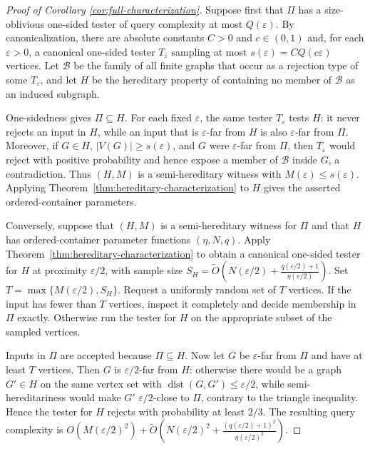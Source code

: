 \documentclass[11pt,reqno,letterpaper]{amsart}
\newcommand{\cB}{{\mathcal B}}
\newcommand{\dist}{\operatorname{dist}}
\theoremstyle{plain}
\theoremstyle{remark}
\begin{document}
\begin{proof}[Proof of Corollary \ref{cor:full-characterization}]
Suppose first that $\Pi$ has a size-oblivious one-sided tester of query
complexity at most $Q(\varepsilon)$.  By canonicalization, there are absolute
constants $C>0$ and $c\in(0,1)$ and, for each $\varepsilon>0$, a canonical
one-sided tester $T_\varepsilon$ sampling at most
$s(\varepsilon)=C Q(c\varepsilon)$ vertices.  Let $\cB$ be the family of all
finite graphs that occur as a rejection type of some $T_\varepsilon$, and let
$H$ be the hereditary property of containing no member of $\cB$ as an induced
subgraph.

One-sidedness gives $\Pi\subseteq H$.  For each fixed $\varepsilon$, the
same tester $T_\varepsilon$ tests $H$: it never rejects an input in $H$, while
an input that is $\varepsilon$-far from $H$ is also $\varepsilon$-far from
$\Pi$.  Moreover, if $G\in H$, $|V(G)|\geq s(\varepsilon)$, and $G$ were
$\varepsilon$-far from $\Pi$, then $T_\varepsilon$ would reject with positive
probability and hence expose a member of $\cB$ inside $G$, a contradiction.
Thus $(H,M)$ is a semi-hereditary witness with
$M(\varepsilon)\leq s(\varepsilon)$.  Applying
Theorem~\ref{thm:hereditary-characterization} to $H$ gives the asserted
ordered-container parameters.

Conversely, suppose that $(H,M)$ is a semi-hereditary witness for $\Pi$ and
that $H$ has ordered-container parameter functions $(\eta,N,q)$.  Apply
Theorem~\ref{thm:hereditary-characterization} to obtain a canonical one-sided
tester for $H$ at proximity $\varepsilon/2$, with sample size
\(S_H=\widetilde O\!\left( N(\varepsilon/2)+ \frac{q(\varepsilon/2)+1}{\eta(\varepsilon/2)} \right).\)
Set
\(T=\max\{M(\varepsilon/2),S_H\}\).  Request a uniformly random set of $T$
vertices.  If the input has fewer than $T$ vertices, inspect it completely and
decide membership in $\Pi$ exactly.  Otherwise run the tester for $H$ on the
appropriate subset of the sampled vertices.

Inputs in $\Pi$ are accepted because $\Pi\subseteq H$.  Now let $G$ be
$\varepsilon$-far from $\Pi$ and have at least $T$ vertices.  Then $G$ is
$\varepsilon/2$-far from $H$: otherwise there would be a graph $G'\in H$ on
the same vertex set with $\dist(G,G')\leq\varepsilon/2$, while
semi-hereditariness would make $G'$ $\varepsilon/2$-close to $\Pi$, contrary
to the triangle inequality.  Hence the tester for $H$ rejects with probability
at least $2/3$.  The resulting query complexity is
\(O\!\left(M(\varepsilon/2)^2\right) +\widetilde O\!\left( N(\varepsilon/2)^2+ \frac{(q(\varepsilon/2)+1)^2}{\eta(\varepsilon/2)^2} \right).\)
\end{proof}
\end{document}
